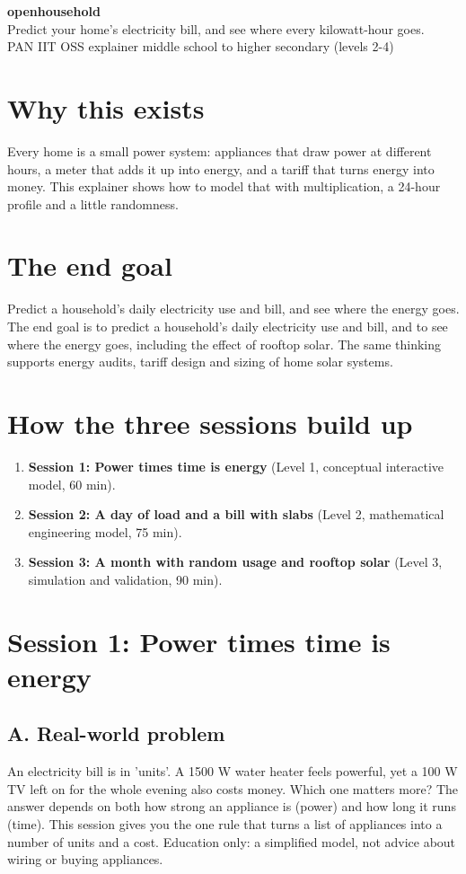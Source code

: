 \documentclass[11pt,a4paper]{article}
\begin{document}
\begin{center}{\LARGE\bfseries openhousehold}\\[0.4em]{\large Predict your home's electricity bill, and see where every kilowatt-hour goes.}\\[0.2em]\small PAN IIT OSS explainer \textbullet{} middle school to higher secondary (levels 2-4)\end{center}

\section*{Why this exists}
Every home is a small power system: appliances that draw power at different hours, a meter that adds it up into energy, and a tariff that turns energy into money. This explainer shows how to model that with multiplication, a 24-hour profile and a little randomness.

\section*{The end goal}
Predict a household's daily electricity use and bill, and see where the energy goes. The end goal is to predict a household's daily electricity use and bill, and to see where the energy goes, including the effect of rooftop solar. The same thinking supports energy audits, tariff design and sizing of home solar systems.

\section*{How the three sessions build up}
\begin{enumerate}[nosep]
\item \textbf{Session 1: Power times time is energy} (Level 1, conceptual interactive model, 60 min).
\item \textbf{Session 2: A day of load and a bill with slabs} (Level 2, mathematical engineering model, 75 min).
\item \textbf{Session 3: A month with random usage and rooftop solar} (Level 3, simulation and validation, 90 min).
\end{enumerate}

\section{Session 1: Power times time is energy}

\subsection*{A. Real-world problem}
An electricity bill is in 'units'. A 1500 W water heater feels powerful, yet a 100 W TV left on for the whole evening also costs money. Which one matters more? The answer depends on both how strong an appliance is (power) and how long it runs (time). This session gives you the one rule that turns a list of appliances into a number of units and a cost. Education only: a simplified model, not advice about wiring or buying appliances.
\end{document}
